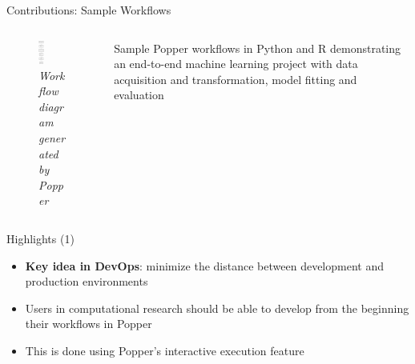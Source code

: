 \documentclass[aspectratio=169, 10pt]{beamer}
\begin{document}
\begin{frame}{Contributions: Sample Workflows}
    \begin{columns}
        \begin{column}{0.5\textwidth} 
            \begin{center}
                \begin{figure}
                    \includegraphics[width=0.2\textwidth]{images/workflow.png}
                    \caption*{{\sl Workflow diagram generated by Popper}}
                \end{figure}
            \end{center}
        \end{column}
        \begin{column}{0.5\textwidth}
            Sample Popper workflows in Python and R demonstrating an end-to-end 
            machine learning project with data acquisition and transformation,
            model fitting and evaluation
        \end{column}
    \end{columns}   
\end{frame}

\begin{frame}{Highlights (1)}
    \begin{itemize}
        \item \textbf{Key idea in DevOps}: minimize the distance between development 
        and production environments 
        \item Users in computational research should be able to develop from the beginning their workflows in Popper 
        \item This is done using Popper's interactive execution feature
    \end{itemize}
\end{frame}
\end{document}
